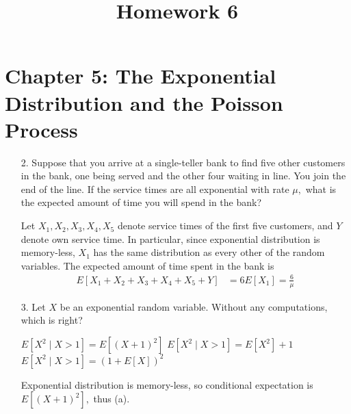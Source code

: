 \documentclass{article}
\begin{document}
\title{Homework 6}
\maketitle
\thispagestyle{fancy}

\section*{Chapter 5: The Exponential Distribution and the Poisson Process}

\begin{itemize}
	\item[2.] Suppose that you arrive at a single-teller bank to find five other customers in the bank, one being served and the other four waiting in line. You join the end of the line. If the service times are all exponential with rate $\mu,$ what is the expected amount of time you will spend in the bank?
		\begin{soln}
			Let $X_1, X_2, X_3, X_4, X_5$ denote service times of the first five customers, and $Y$ denote own service time. In particular, since exponential distribution is memory-less, $X_1$ has the same distribution as every other of the random variables. The expected amount of time spent in the bank is
			\begin{align*}
				E[X_1+X_2+X_3+X_4+X_5+Y] &= 6E[X_1] = \frac{6}{\mu}
			\end{align*}
		\end{soln}

	\item[3.] Let $X$ be an exponential random variable. Without any computations, which is right?
		\begin{enumerate}[(a)]
				\ii $E[X^2\mid X>1]=E[(X+1)^2]$ 
				\ii $E[X^2\mid X>1]=E[X^2]+1$
				\ii $E[X^2\mid X>1]=(1+E[X])^2$
		\end{enumerate}
		\begin{answer*}
			Exponential distribution is memory-less, so conditional expectation is $E[(X+1)^2],$ thus (a).
		\end{answer*}


\end{itemize}
\end{document}
